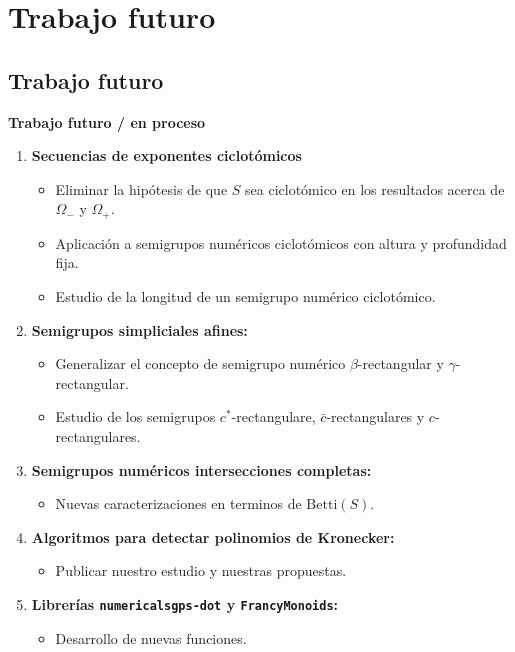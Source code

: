 \documentclass[10pt,compress]{beamer}
\begin{document}
\section{Trabajo futuro}

\subsection{Trabajo futuro}

\begin{frame}
  \begin{center}
    {\color{ChetwodeBlue}\Large\textbf{Trabajo futuro / en proceso}}
  \end{center}
  \vspace{-3mm}
  \begin{enumerate}
  \item \textbf{Secuencias de exponentes ciclotómicos}
    \begin{itemize}
    \item Eliminar la hipótesis de que $S$ sea ciclotómico en los resultados acerca de $\Omega_-$ y
      $\Omega_+$.
    \item Aplicación a semigrupos numéricos ciclotómicos con altura y profundidad fija.
    \item Estudio de la longitud de un semigrupo numérico ciclotómico.
    \end{itemize}
  \item \textbf{Semigrupos simpliciales afines:}
    \begin{itemize}
    \item Generalizar el concepto de semigrupo numérico $\beta$-rectangular y $\gamma$-rectangular.
    \item Estudio de los semigrupos $c^{*}$-rectangulare, $\bar{c}$-rectangulares y
      $c$-rectangulares.
    \end{itemize}
  \item \textbf{Semigrupos numéricos intersecciones completas:}
    \begin{itemize}
    \item Nuevas caracterizaciones en terminos de $\mathrm{Betti}(S)$.
    \end{itemize}
  \item \textbf{Algoritmos para detectar polinomios de Kronecker:}
    \begin{itemize}
    \item Publicar nuestro estudio y nuestras propuestas.
    \end{itemize}
  \item \textbf{Librerías \texttt{numericalsgps-dot} y \texttt{FrancyMonoids}:}    
    \begin{itemize}
    \item Desarrollo de nuevas funciones.
    \end{itemize}
  \end{enumerate}
\end{frame}
\end{document}
